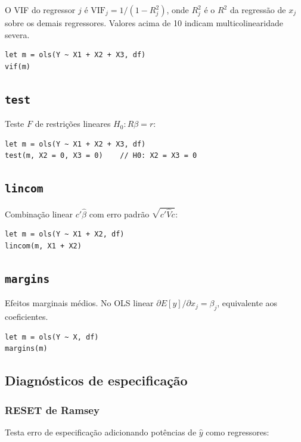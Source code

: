 O VIF do regressor $j$ é $\mathrm{VIF}_j = 1/(1 - R_j^2)$, onde $R_j^2$ é o
$R^2$ da regressão de $x_j$ sobre os demais regressores. Valores acima de 10
indicam multicolinearidade severa.

\begin{lstlisting}
let m = ols(Y ~ X1 + X2 + X3, df)
vif(m)
\end{lstlisting}

\subsection{\texttt{test}}

Teste $F$ de restrições lineares $H_0: R\beta = r$:

\begin{lstlisting}
let m = ols(Y ~ X1 + X2 + X3, df)
test(m, X2 = 0, X3 = 0)    // H0: X2 = X3 = 0
\end{lstlisting}

\subsection{\texttt{lincom}}

Combinação linear $c'\hat{\beta}$ com erro padrão $\sqrt{c'\hat{V}c}$:

\begin{lstlisting}
let m = ols(Y ~ X1 + X2, df)
lincom(m, X1 + X2)
\end{lstlisting}

\subsection{\texttt{margins}}

Efeitos marginais médios. No OLS linear $\partial E[y]/\partial x_j = \beta_j$,
equivalente aos coeficientes.

\begin{lstlisting}
let m = ols(Y ~ X, df)
margins(m)
\end{lstlisting}

\subsection{Diagnósticos de especificação}

\subsubsection*{RESET de Ramsey}

Testa erro de especificação adicionando potências de $\hat{y}$ como regressores:

